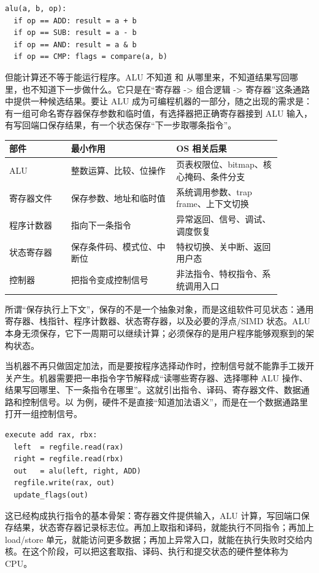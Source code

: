 \begin{lstlisting}
alu(a, b, op):
  if op == ADD: result = a + b
  if op == SUB: result = a - b
  if op == AND: result = a & b
  if op == CMP: flags = compare(a, b)
\end{lstlisting}

但能计算还不等于能运行程序。ALU 不知道  和  从哪里来，不知道结果写回哪里，也不知道下一步做什么。它只是在“寄存器 -> 组合逻辑 -> 寄存器”这条通路中提供一种候选结果。要让 ALU 成为可编程机器的一部分，随之出现的需求是：有一组可命名寄存器保存参数和临时值，有选择器把正确寄存器接到 ALU 输入，有写回端口保存结果，有一个状态保存“下一步取哪条指令”。

\begin{longtable}{p{0.2\linewidth}p{0.34\linewidth}p{0.34\linewidth}}
\toprule
部件 & 最小作用 & OS 相关后果 \\
\midrule
ALU & 整数运算、比较、位操作 & 页表权限位、bitmap、核心掩码、条件分支 \\
寄存器文件 & 保存参数、地址和临时值 & 系统调用参数、trap frame、上下文切换 \\
程序计数器 & 指向下一条指令 & 异常返回、信号、调试、调度恢复 \\
状态寄存器 & 保存条件码、模式位、中断位 & 特权切换、关中断、返回用户态 \\
控制器 & 把指令变成控制信号 & 非法指令、特权指令、系统调用入口 \\
\bottomrule
\end{longtable}

所谓“保存执行上下文”，保存的不是一个抽象对象，而是这组软件可见状态：通用寄存器、栈指针、程序计数器、状态寄存器，以及必要的浮点/SIMD 状态。ALU 本身无须保存，它下一周期可以继续计算；必须保存的是用户程序能够观察到的架构状态。

当机器不再只做固定加法，而是要按程序选择动作时，控制信号就不能靠手工拨开关产生。机器需要把一串指令字节解释成“读哪些寄存器、选择哪种 ALU 操作、结果写回哪里、下一条指令在哪里”。这就引出指令、译码、寄存器文件、数据通路和控制信号。以  为例，硬件不是直接“知道加法语义”，而是在一个数据通路里打开一组控制信号。

\begin{lstlisting}
execute add rax, rbx:
  left  = regfile.read(rax)
  right = regfile.read(rbx)
  out   = alu(left, right, ADD)
  regfile.write(rax, out)
  update_flags(out)
\end{lstlisting}

这已经构成执行指令的基本骨架：寄存器文件提供输入，ALU 计算，写回端口保存结果，状态寄存器记录标志位。再加上取指和译码，就能执行不同指令；再加上 load/store 单元，就能访问更多数据；再加上异常入口，就能在执行失败时交给内核。在这个阶段，可以把这套取指、译码、执行和提交状态的硬件整体称为 CPU。

